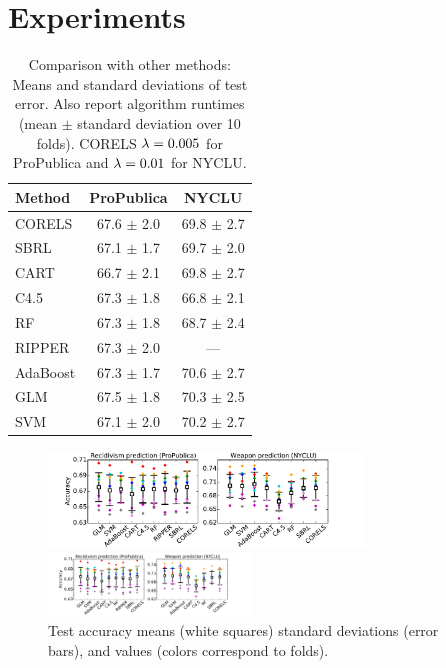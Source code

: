 \section{Experiments}
\label{sec:experiments}

\begin{arxiv}
\begin{table}[t!]
\centering
\begin{tabular}{l | c | c}
Method & ProPublica & NYCLU \\
\hline
CORELS & 67.6 $\pm$ 2.0 & 69.8 $\pm$ 2.7 \\
SBRL & 67.1 $\pm$ 1.7 & 69.7 $\pm$ 2.0 \\
CART & 66.7 $\pm$ 2.1 & 69.8 $\pm$ 2.7 \\
C4.5 & 67.3 $\pm$ 1.8 & 66.8 $\pm$ 2.1 \\
RF & 67.3 $\pm$ 1.8 & 68.7 $\pm$ 2.4 \\
RIPPER & 67.3 $\pm$ 2.0 & --- \\
AdaBoost & 67.3 $\pm$ 1.7 & 70.6 $\pm$ 2.7 \\
GLM & 67.5 $\pm$ 1.8 & 70.3 $\pm$ 2.5 \\
SVM & 67.1 $\pm$ 2.0 & 70.2 $\pm$ 2.7 \\
\end{tabular}
\vspace{5mm}
\caption{Comparison with other methods:
Means and standard deviations of test error.
Also report algorithm runtimes (mean $\pm$ standard deviation over 10 folds).
CORELS ${{\lambda} = 0.005}$ for ProPublica and ${{\lambda} = 0.01}$ for NYCLU.}
\label{tab:comparison}
\end{table}
\end{arxiv}

\begin{figure}[t!]
\begin{center}
\begin{arxiv}
\includegraphics[width=0.75\textwidth]{figs/compare-compas-weapon.pdf}
\end{arxiv}
\begin{kdd}
\includegraphics[trim={10mm, 11mm, 25mm, 5mm},
width=0.48\textwidth]{figs/compare-compas-weapon.pdf}
\end{kdd}
\end{center}
\caption{Test accuracy means (white squares)
standard deviations (error bars),
and values (colors correspond to folds).
}
\label{fig:comparison}
\end{figure}


